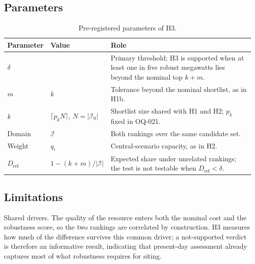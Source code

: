 \subsection{Parameters}
\label{subsec:h3_parameters}

\begin{table}[htbp]
    \centering
    \caption{Pre-registered parameters of H3.}
    \label{tab:h3_parameters}
    \small
    \renewcommand{\arraystretch}{1.2}
    \begin{tabularx}{\textwidth}{
        @{}
        >{\raggedright\arraybackslash}p{2.4cm}
        >{\raggedright\arraybackslash}p{3.0cm}
        >{\raggedright\arraybackslash}X
        @{}
    }
        \toprule
        \textbf{Parameter} & \textbf{Value} & \textbf{Role} \\
        \midrule
        $\delta$ & 0.20 & Primary threshold; H3 is supported when at least one in
        five robust megawatts lies beyond the nominal top $k+m$. \\
        \addlinespace
        $m$ & $k$ & Tolerance beyond the nominal shortlist, as in H1b. \\
        \addlinespace
        $k$ & $\lceil p_k N\rceil$, $N=|\mathcal{I}_0|$ & Shortlist size shared
        with H1 and H2; $p_k$ fixed in OQ-021. \\
        \addlinespace
        Domain & $\mathcal{I}$ & Both rankings over the same candidate set. \\
        \addlinespace
        Weight & $q_i$ & Central-scenario capacity, as in H2. \\
        \addlinespace
        $D_{\mathrm{ref}}$ & $1-(k+m)/|\mathcal{I}|$ & Expected share under
        unrelated rankings; the test is not testable when
        $D_{\mathrm{ref}}<\delta$. \\
        \bottomrule
    \end{tabularx}
\end{table}

\subsection{Limitations}
\label{subsec:h3_limitations}

Shared drivers. The quality of the resource enters both the nominal cost and the
robustness score, so the two rankings are correlated by construction. H3 measures
how much of the difference survives this common driver; a not-supported verdict
is therefore an informative result, indicating that present-day assessment
already captures most of what robustness requires for siting.

